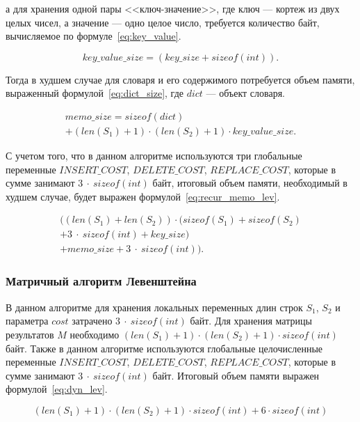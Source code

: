 а для хранения одной пары <<ключ-значение>>, где ключ --- кортеж из двух целых чисел, а значение --- одно целое число, требуется количество байт, вычисляемое по формуле~\ref{eq:key_value}.

\begin{equation}
    \label{eq:key_value}
    key\_value\_size = (key\_size + sizeof(int)).
\end{equation}

Тогда в худшем случае для словаря и его содержимого потребуется объем памяти, выраженный формулой~\ref{eq:dict_size}, где $dict$ --- объект словаря.

\begin{multline}
    \label{eq:dict_size}
    memo\_size = sizeof(dict) \\
    + (len(S_1) + 1) \cdot (len(S_2) + 1) \cdot key\_value\_size.
\end{multline}

С учетом того, что в данном алгоритме используются три глобальные переменные $INSERT\_COST$, $DELETE\_COST$, $REPLACE\_COST$, которые в сумме занимают $3~\cdot~sizeof(int)$ байт, итоговый объем памяти, необходимый в худшем случае, будет выражен формулой~\ref{eq:recur_memo_lev}.

\begin{multline}
    \label{eq:recur_memo_lev}
    ((len(S_1) + len(S_2)) \cdot (sizeof(S_1) + sizeof(S_2) \\
    + 3~\cdot~sizeof(int) + key\_size) \\
    + memo\_size + 3~\cdot~sizeof(int)).
\end{multline}

\subsubsection{Матричный алгоритм Левенштейна}

В данном алгоритме для хранения локальных переменных длин строк $S_1$, $S_2$ и параметра $cost$ затрачено $3~\cdot~sizeof(int)$ байт. Для хранения матрицы результатов $M$ необходимо $(len(S_1) + 1) \cdot (len(S_2) + 1) \cdot sizeof(int)$ байт. Также в данном алгоритме используются глобальные целочисленные переменные $INSERT\_COST$, $DELETE\_COST$, $REPLACE\_COST$, которые в сумме занимают $3~\cdot~sizeof(int)$ байт. Итоговый объем памяти выражен формулой~\ref{eq:dyn_lev}.

\begin{equation}
    \label{eq:dyn_lev}
    (len(S_1) + 1) \cdot (len(S_2) + 1) \cdot sizeof(int) + 6 \cdot sizeof(int)
\end{equation}

